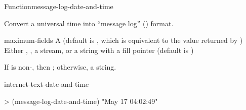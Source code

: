 \documentclass[10pt,twoside,english,pdftex]{article}
\begin{document}
\begin{functiondoc}{Function}{message-log-date-and-time}{%
      
    \returns{} }
% 

\fnsyntax

\fnpurpose Convert a universal time into ``message log''
() format.

\fnpackage {}

\fnmodule {}

\fnargs
\begin{args}{maximum-fields}
 A  (default is \nil,
  which is equivalent to the value returned by
  )
\arg[destination] Either \nil, , a stream, or a string with a fill 
pointer (default is \nil)
\end{args}

\fnreturns If  is non-\nil, then \nil; otherwise, a string.

\begin{alsos}{internet-text-date-and-time}
\end{alsos}

\fnexample
%
\W\supp
\begin{example}
> (message-log-date-and-time)
"May 17 04:02:49"
\end{example}

\end{functiondoc}

\end{document}
